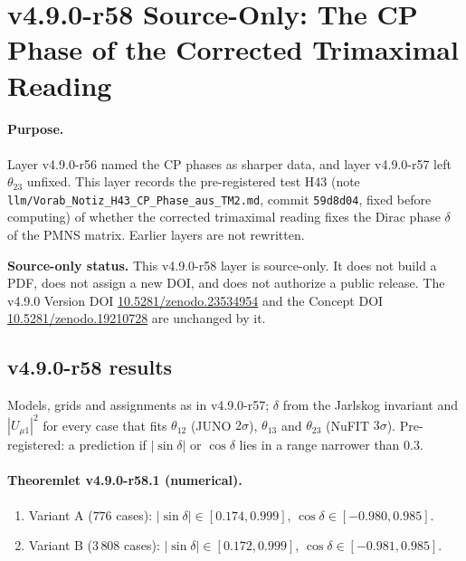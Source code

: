 \clearpage
\section*{v4.9.0-r58 Source-Only: The CP Phase of the Corrected Trimaximal Reading}
\label{sec:v490-r58-cp-phase}

\paragraph{Purpose.}
Layer v4.9.0-r56 named the CP phases as sharper data, and layer v4.9.0-r57 left \(\theta_{23}\) unfixed.  This layer records the pre-registered test H43 (note
\texttt{llm/Vorab\_Notiz\_H43\_CP\_Phase\_aus\_TM2.md}, commit \texttt{59d8d04}, fixed before computing) of whether the corrected trimaximal reading fixes the Dirac
phase \(\delta\) of the PMNS matrix.  Earlier layers are not rewritten.

\noindent\textbf{Source-only status.}
This v4.9.0-r58 layer is source-only.  It does not build a PDF, does not assign a new DOI,
and does not authorize a public release.  The v4.9.0 Version DOI
\href{https://doi.org/10.5281/zenodo.23534954}{10.5281/zenodo.23534954} and the Concept DOI
\href{https://doi.org/10.5281/zenodo.19210728}{10.5281/zenodo.19210728} are unchanged by it.

\subsection*{v4.9.0-r58 results}
\label{subsec:v490-r58-results}

Models, grids and assignments as in v4.9.0-r57; \(\delta\) from the Jarlskog invariant and \(|U_{\mu1}|^2\) for every case that fits \(\theta_{12}\) (JUNO \(2\sigma\)), \(\theta_{13}\)
and \(\theta_{23}\) (NuFIT \(3\sigma\)).  Pre-registered: a prediction if \(|\sin\delta|\) or \(\cos\delta\) lies in a range narrower than \(0.3\).

\paragraph{Theoremlet v4.9.0-r58.1 (numerical).}
\begin{enumerate}[leftmargin=2em]
\item[(a)] Variant A (\(776\) cases): \(|\sin\delta|\in[0.174,0.999]\), \(\cos\delta\in[-0.980,0.985]\).
\item[(b)] Variant B (\(3\,808\) cases): \(|\sin\delta|\in[0.172,0.999]\), \(\cos\delta\in[-0.981,0.985]\).
\end{enumerate}


